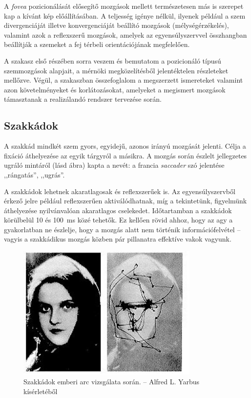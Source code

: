 A \emph{fovea} pozicionálását elősegítő mozgások mellett természetesen más is szerepet kap a kívánt kép előállításában. A teljesség igénye nélkül, ilyenek például a szem divergenciáját illetve konvergenciáját beállító mozgások (mélységérzékelés), valamint azok a reflexszerű mozgások, amelyek az egyensúlyszervvel összhangban beállítják a szemeket a fej térbeli orientációjának megfelelően.

\bigskip

A szakasz első részében sorra veszem és bemutatom a pozicionáló típusú szemmozgások alapjait, a mérnöki megközelítésből jelentéktelen részleteket mellőzve. Végül, a  szakaszban összefoglalom a megszerzett ismereteket valamint azon követelményeket és korlátozásokat, amelyeket a megismert mozgások támasztanak a realizálandó rendszer tervezése során.

\subsection{Szakkádok}\label{sect:szakkadok}

A szakkád mindkét szem gyors, egyidejű, azonos irányú mozgását jelenti. Célja a fixáció áthelyezése az egyik tárgyról a másikra. A mozgás során észlelt jellegzetes ugráló mintáról (lásd  ábra) kapta a nevét: a francia \emph{saccader} szó jelentése ,,rángatás'', ,,ugrás''.

A szakkádok lehetnek akaratlagosak és reflexszerűek is. Az egyensúlyszervből érkező jelre például reflexszerűen aktiválódhatnak, míg a tekintetünk, figyelmünk áthelyezése nyilvánvalóan akaratlagos cselekedet. Időtartamban a szakkádok körülbelül 10 és 100~ms közé tehetők. Ez kellően rövid ahhoz, hogy az agy a gyakorlatban ne észlelje, hogy a mozgás alatt nem történik információfelvétel -- vagyis a szakkádikus mozgás közben pár pillanatra effektíve vakok vagyunk. \cite{shebilske}

\begin{figure}[!ht]
\centering
\includegraphics[width=90mm, keepaspectratio]{figures/yarbus_saccadic.jpg}
\caption{Szakkádok emberi arc vizsgálata során. -- Alfred L. Yarbus kísérletéből}
\label{fig:yarbus_saccadic}
\end{figure}

